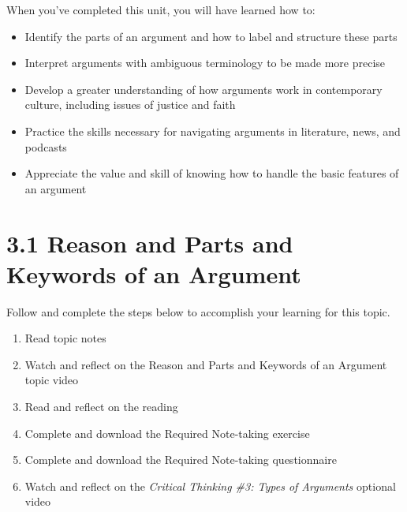 \documentclass[
]{book}
\providecommand{\tightlist}{%
  \setlength{\itemsep}{0pt}\setlength{\parskip}{0pt}}
\begin{document}
When you've completed this unit, you will have learned how to:

\begin{itemize}
\tightlist
\item
  Identify the parts of an argument and how to label and structure these parts
\item
  Interpret arguments with ambiguous terminology to be made more precise
\item
  Develop a greater understanding of how arguments work in contemporary culture, including issues of justice and faith
\item
  Practice the skills necessary for navigating arguments in literature, news, and podcasts
\item
  Appreciate the value and skill of knowing how to handle the basic features of an argument
\end{itemize}

\hypertarget{reason-and-parts-and-keywords-of-an-argument}{%
\section*{3.1 Reason and Parts and Keywords of an Argument}\label{reason-and-parts-and-keywords-of-an-argument}}

Follow and complete the steps below to accomplish your learning for this topic.

\begin{enumerate}
\def\labelenumi{\arabic{enumi}.}
\tightlist
\item
  Read topic notes
\item
  Watch and reflect on the Reason and Parts and Keywords of an Argument topic video
\item
  Read and reflect on the reading
\item
  Complete and download the Required Note-taking exercise
\item
  Complete and download the Required Note-taking questionnaire
\item
  Watch and reflect on the \emph{Critical Thinking \#3: Types of Arguments} optional video
\end{enumerate}
\end{document}
